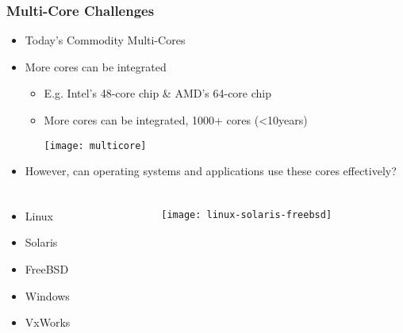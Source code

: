 \begin{frame}[plain]	
	\frametitle{Multi-Core Challenges}
	
	\begin{itemize}\Large
		\item Today's Commodity Multi-Cores
		\item More cores can be integrated
		\begin{itemize}\Large
			\item E.g. Intel's 48-core chip \& AMD's 64-core chip
			\item More cores can be integrated, 1000+ cores (<10years)

	\centering
	\texttt{[image: multicore]}
			
		\end{itemize}\pause
	\item However, can operating systems and applications use
	these cores effectively?
	\end{itemize}

	
\end{frame}


\begin{frame}
	\frametitle{ }
	\begin{columns}
		\begin{column}{.5\textwidth}
			
		\begin{itemize}\LARGE
			\item Linux
			\item Solaris
			\item FreeBSD
			\item Windows
			\item VxWorks
			
		\end{itemize}
			
		\end{column}
		
		\begin{column}{.5\textwidth}
			
			\texttt{[image: linux-solaris-freebsd]}
			
		\end{column}
	\end{columns}
\end{frame}

